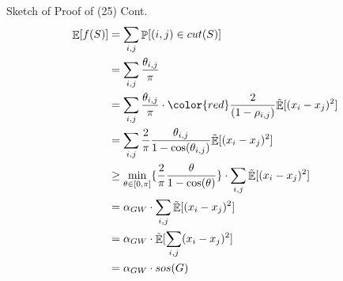 \documentclass[10pt, xcolor={dvipsnames}]{beamer}
\DeclareMathOperator{\Ex}{\mathbb{E}}
\DeclareMathOperator{\Prob}{\mathbb{P}}
\begin{document}
\begin{frame}{Sketch of Proof of (25) Cont.}
\vspace{-.4cm}
\begin{align*}
\Ex[f(S)] &= \sum_{i, j}  \Prob[(i, j) \in cut(S)] \\
&= \sum_{i, j} \frac{\theta_{i, j}}{\pi} \\
&= \sum_{i, j} \frac{\theta_{i, j}}{\pi} \cdot {\color{red} \frac{2}{(1 - \rho_{i, j})} \tilde{\Ex}[(x_{i} - x_{j})^{2}]} \\
&= \sum_{i, j} \frac{2}{\pi} \frac{\theta_{i, j}}{1 - \cos(\theta_{i, j})} 
\tilde{\Ex}[(x_{i} - x_{j})^{2}] \\
&\geq \min_{\theta \in [0, \pi]} \lbrace 
\frac{2}{\pi}\frac{\theta}{ { 1 - \cos(\theta) }} 
\rbrace \cdot 
\sum_{i, j}\tilde{\Ex}[(x_{i} - x_{j})^{2}]\\
&= \alpha_{GW} \cdot \sum_{i, j}\tilde{\Ex}[(x_{i} - x_{j})^{2}]\\
&= \alpha_{GW} \cdot \tilde{\Ex}[\sum_{i, j}(x_{i} - x_{j})^{2}]\\
&= \alpha_{GW} \cdot sos(G)
\end{align*}
\end{frame}
\end{document}
